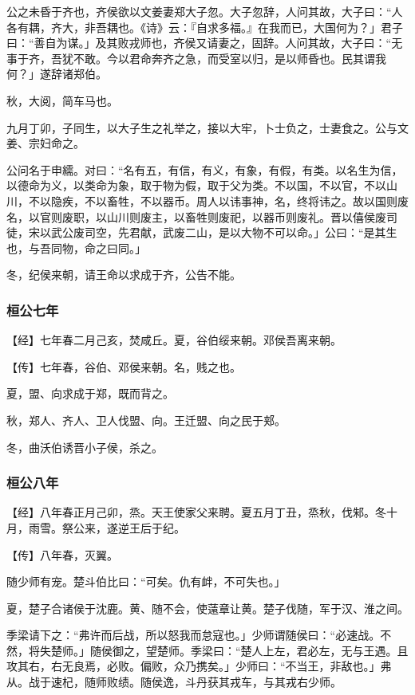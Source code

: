 \documentclass[]{article}
\begin{document}
公之未昏于齐也，齐侯欲以文姜妻郑大子忽。大子忽辞，人问其故，大子曰：``人各有耦，齐大，非吾耦也。《诗》云：『自求多福。』在我而已，大国何为？」君子曰：``善自为谋。」及其败戎师也，齐侯又请妻之，固辞。人问其故，大子曰：``无事于齐，吾犹不敢。今以君命奔齐之急，而受室以归，是以师昏也。民其谓我何？」遂辞诸郑伯。

秋，大阅，简车马也。

九月丁卯，子同生，以大子生之礼举之，接以大牢，卜士负之，士妻食之。公与文姜、宗妇命之。

公问名于申繻。对曰：``名有五，有信，有义，有象，有假，有类。以名生为信，以德命为义，以类命为象，取于物为假，取于父为类。不以国，不以官，不以山川，不以隐疾，不以畜牲，不以器币。周人以讳事神，名，终将讳之。故以国则废名，以官则废职，以山川则废主，以畜牲则废祀，以器币则废礼。晋以僖侯废司徒，宋以武公废司空，先君献，武废二山，是以大物不可以命。」公曰：``是其生也，与吾同物，命之曰同。」

冬，纪侯来朝，请王命以求成于齐，公告不能。

\hypertarget{header-n234}{%
\subsubsection{桓公七年}\label{header-n234}}

【经】七年春二月己亥，焚咸丘。夏，谷伯绥来朝。邓侯吾离来朝。

【传】七年春，谷伯、邓侯来朝。名，贱之也。

夏，盟、向求成于郑，既而背之。

秋，郑人、齐人、卫人伐盟、向。王迁盟、向之民于郏。

冬，曲沃伯诱晋小子侯，杀之。

\hypertarget{header-n242}{%
\subsubsection{桓公八年}\label{header-n242}}

【经】八年春正月己卯，烝。天王使家父来聘。夏五月丁丑，烝秋，伐邾。冬十月，雨雪。祭公来，遂逆王后于纪。

【传】八年春，灭翼。

随少师有宠。楚斗伯比曰：``可矣。仇有衅，不可失也。」

夏，楚子合诸侯于沈鹿。黄、随不会，使薳章让黄。楚子伐随，军于汉、淮之间。

季梁请下之：``弗许而后战，所以怒我而怠寇也。」少师谓随侯曰：``必速战。不然，将失楚师。」随侯御之，望楚师。季梁曰：``楚人上左，君必左，无与王遇。且攻其右，右无良焉，必败。偏败，众乃携矣。」少师曰：``不当王，非敌也。」弗从。战于速杞，随师败绩。随侯逸，斗丹获其戎车，与其戎右少师。
\end{document}
